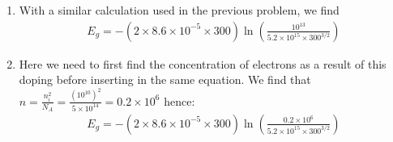 \documentclass{article}
\begin{document}
\begin{prob}
\begin{enumerate}
    \item With a similar calculation used in the previous problem, we find \[\begin{split}
    E_g=-(2\times8.6\times10^{-5}\times300)\ln(\frac{10^{13}}{5.2\times10^{15}\times300^{3/2}})
    \end{split}\]
    \item Here we need to first find the concentration of electrons as a result of this doping before inserting in the same equation. We find that $n=\frac{n_i^2}{N_A}=\frac{(10^{10})^2}{5\times10^{14}}=0.2\times10^6$ hence:
    \[\begin{split}
    E_g=-(2\times8.6\times10^{-5}\times300)\ln(\frac{0.2\times10^6}{5.2\times10^{15}\times300^{3/2}})
    \end{split}\]
\end{enumerate}
\end{prob}
\end{document}
